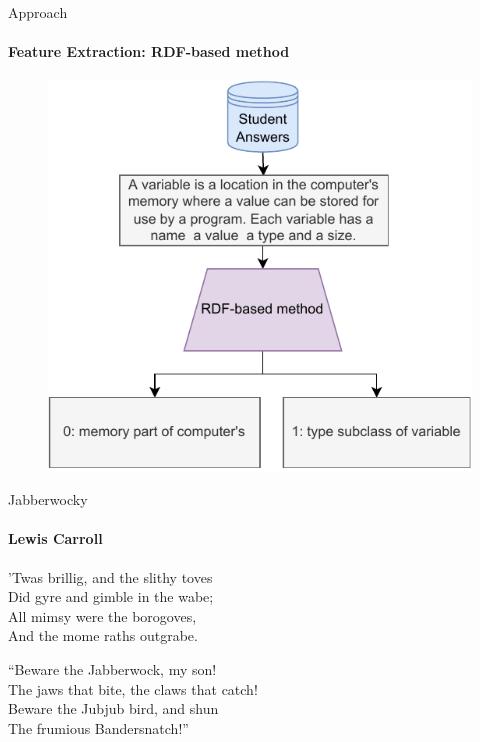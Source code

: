 \documentclass[aspectratio=169]{beamer}
\begin{document}
\begin{frame}{Approach}
\framesubtitle{Feature Extraction: RDF-based method}
\begin{figure}
\centering
\includegraphics[scale = 0.65]{images/RDF_FE.pdf}
\label{fig:rdf fe}
\end{figure}
\end{frame}






\begin{frame}{Jabberwocky}
      \framesubtitle{Lewis Carroll}%
      'Twas brillig, and the slithy toves\\
      Did gyre and gimble in the wabe;\\
      All mimsy were the borogoves,\\
      And the mome raths outgrabe.\\\bigskip

      “Beware the Jabberwock, my son!\\
      The jaws that bite, the claws that catch!\\
      Beware the Jubjub bird, and shun\\
      The frumious Bandersnatch!”\\
\end{frame}
\end{document}
